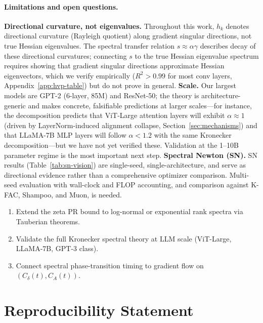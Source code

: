 \documentclass{article}
\begin{document}
\paragraph{Limitations and open questions.}
\textbf{Directional curvature, not eigenvalues.} Throughout this work, $h_k$ denotes directional curvature (Rayleigh quotient) along gradient singular directions, not true Hessian eigenvalues. The spectral transfer relation $s \approx \alpha\gamma$ describes decay of these directional curvatures; connecting $s$ to the true Hessian eigenvalue spectrum requires showing that gradient singular directions approximate Hessian eigenvectors, which we verify empirically ($R^2 > 0.99$ for most conv layers, Appendix~\ref{app:hvp-table}) but do not prove in general.
\textbf{Scale.} Our largest models are GPT-2 (6-layer, 85M) and ResNet-50; the theory is architecture-generic and makes concrete, falsifiable predictions at larger scales---for instance, the decomposition predicts that ViT-Large attention layers will exhibit $\alpha \approx 1$ (driven by LayerNorm-induced alignment collapse, Section~\ref{sec:mechanisms}) and that LLaMA-7B MLP layers will follow $\alpha < 1.2$ with the same Kronecker decomposition---but we have not yet verified these. Validation at the 1--10B parameter regime is the most important next step.
\textbf{Spectral Newton (SN).} SN results (Table~\ref{tab:sn-vision}) are single-seed, single-architecture, and serve as directional evidence rather than a comprehensive optimizer comparison. Multi-seed evaluation with wall-clock and FLOP accounting, and comparison against K-FAC, Shampoo, and Muon, is needed.
\begin{enumerate}[leftmargin=*,nosep]
    \item Extend the zeta PR bound to log-normal or exponential rank spectra via Tauberian theorems.
    \item Validate the full Kronecker spectral theory at LLM scale (ViT-Large, LLaMA-7B, GPT-3 class).
    \item Connect spectral phase-transition timing to gradient flow on $(C_\delta(t), C_A(t))$.
\end{enumerate}

\section*{Reproducibility Statement}
\end{document}
